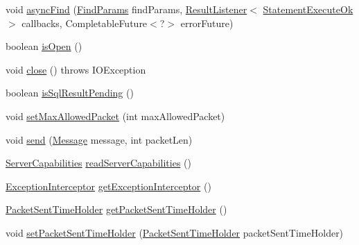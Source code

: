 \begin{DoxyCompactItemize}
\item 
void \mbox{\hyperlink{classcom_1_1mysql_1_1cj_1_1protocol_1_1x_1_1_x_protocol_a2880204cc61b5a581f7add54e8d8a268}{async\+Find}} (\mbox{\hyperlink{interfacecom_1_1mysql_1_1cj_1_1xdevapi_1_1_find_params}{Find\+Params}} find\+Params, \mbox{\hyperlink{interfacecom_1_1mysql_1_1cj_1_1protocol_1_1_result_listener}{Result\+Listener}}$<$ \mbox{\hyperlink{classcom_1_1mysql_1_1cj_1_1protocol_1_1x_1_1_statement_execute_ok}{Statement\+Execute\+Ok}} $>$ callbacks, Completable\+Future$<$?$>$ error\+Future)
\item 
boolean \mbox{\hyperlink{classcom_1_1mysql_1_1cj_1_1protocol_1_1x_1_1_x_protocol_ad0b0ca8196358ef9dbd099c71493997a}{is\+Open}} ()
\item 
void \mbox{\hyperlink{classcom_1_1mysql_1_1cj_1_1protocol_1_1x_1_1_x_protocol_a57f0cb65f276893aee9581111edad17d}{close}} ()  throws I\+O\+Exception 
\item 
boolean \mbox{\hyperlink{classcom_1_1mysql_1_1cj_1_1protocol_1_1x_1_1_x_protocol_a61040719cc9517f8a02774f0b6fae9b5}{is\+Sql\+Result\+Pending}} ()
\item 
void \mbox{\hyperlink{classcom_1_1mysql_1_1cj_1_1protocol_1_1x_1_1_x_protocol_ac8f9ada3cf4ca3905b4ed85093a37e0a}{set\+Max\+Allowed\+Packet}} (int max\+Allowed\+Packet)
\item 
void \mbox{\hyperlink{classcom_1_1mysql_1_1cj_1_1protocol_1_1x_1_1_x_protocol_ac6e989e8d119f8c1efd0fda253199727}{send}} (\mbox{\hyperlink{interfacecom_1_1mysql_1_1cj_1_1protocol_1_1_message}{Message}} message, int packet\+Len)
\item 
\mbox{\hyperlink{interfacecom_1_1mysql_1_1cj_1_1protocol_1_1_server_capabilities}{Server\+Capabilities}} \mbox{\hyperlink{classcom_1_1mysql_1_1cj_1_1protocol_1_1x_1_1_x_protocol_ade4f8f02c047acca33185b6460027ddb}{read\+Server\+Capabilities}} ()
\item 
\mbox{\hyperlink{interfacecom_1_1mysql_1_1cj_1_1exceptions_1_1_exception_interceptor}{Exception\+Interceptor}} \mbox{\hyperlink{classcom_1_1mysql_1_1cj_1_1protocol_1_1x_1_1_x_protocol_a79956bf3488c1946b49ff09ad2646bd4}{get\+Exception\+Interceptor}} ()
\item 
\mbox{\hyperlink{interfacecom_1_1mysql_1_1cj_1_1protocol_1_1_packet_sent_time_holder}{Packet\+Sent\+Time\+Holder}} \mbox{\hyperlink{classcom_1_1mysql_1_1cj_1_1protocol_1_1x_1_1_x_protocol_ac97de7fb2df918128b58d1d6c1dcf2fa}{get\+Packet\+Sent\+Time\+Holder}} ()
\item 
void \mbox{\hyperlink{classcom_1_1mysql_1_1cj_1_1protocol_1_1x_1_1_x_protocol_ad405a2fe2c30b3dcd9f8dcc1d866c7cf}{set\+Packet\+Sent\+Time\+Holder}} (\mbox{\hyperlink{interfacecom_1_1mysql_1_1cj_1_1protocol_1_1_packet_sent_time_holder}{Packet\+Sent\+Time\+Holder}} packet\+Sent\+Time\+Holder)

\end{DoxyCompactItemize}

